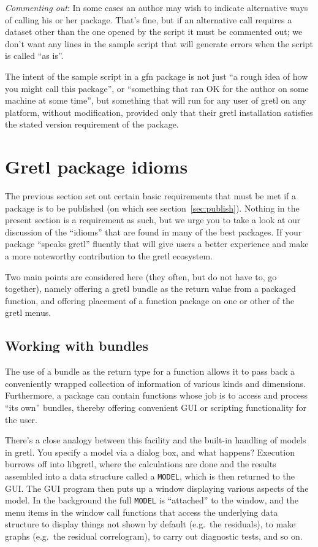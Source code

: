 \documentclass[oneside]{book}
\begin{document}
\vspace{1ex}
\textit{Commenting out}: In some cases an author may wish to
  indicate alternative ways of calling his or her package. That's
  fine, but if an alternative call requires a dataset other than
  the one opened by the script it must be commented out; we don't
  want any lines in the sample script that will generate errors
  when the script is called ``as is''.

\vspace{1ex}
The intent of the sample script in a gfn package is not just ``a rough
idea of how you might call this package'', or ``something that ran OK
for the author on some machine at some time'', but something that will
run for any user of gretl on any platform, without modification,
provided only that their gretl installation satisfies the stated
version requirement of the package.

\section{Gretl package idioms}
\label{sec:idioms}

The previous section set out certain basic requirements that must be
met if a package is to be published (on which see
section~\ref{sec:publish}). Nothing in the present section is a
requirement as such, but we urge you to take a look at our discussion
of the ``idioms'' that are found in many of the best packages. If your
package ``speaks gretl'' fluently that will give users a better
experience and make a more noteworthy contribution to the gretl
ecosystem.

Two main points are considered here (they often, but do not have to,
go together), namely offering a gretl bundle as the return value from
a packaged function, and offering placement of a function package on
one or other of the gretl menus.

\subsection{Working with bundles}

The use of a bundle as the return type for a function allows it to
pass back a conveniently wrapped collection of information of various
kinds and dimensions. Furthermore, a package can contain functions
whose job is to access and process ``its own'' bundles, thereby
offering convenient GUI or scripting functionality for the user.

There's a close analogy between this facility and the built-in
handling of models in gretl. You specify a model via a dialog box, and
what happens? Execution burrows off into libgretl, where the
calculations are done and the results assembled into a data structure
called a \texttt{MODEL}, which is then returned to the GUI. The GUI
program then puts up a window displaying various aspects of the
model. In the background the full \texttt{MODEL} is ``attached'' to
the window, and the menu items in the window call functions that
access the underlying data structure to display things not shown by
default (e.g.\ the residuals), to make graphs (e.g.\ the residual
correlogram), to carry out diagnostic tests, and so on.
\end{document}
